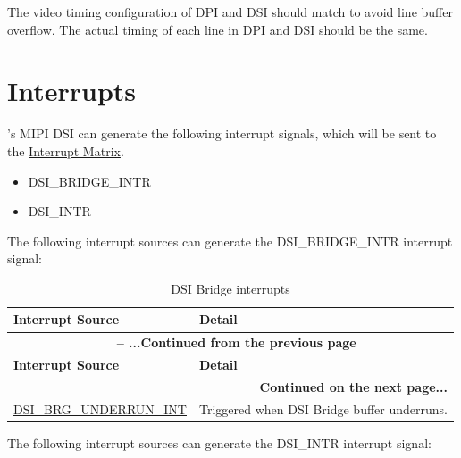 \documentclass[main\_\_EN.tex]{subfiles}
\begin{document}
The video timing configuration of DPI and DSI should match to avoid line buffer overflow. The actual timing of each line in DPI and DSI should be the same.


\section{Interrupts}
\chipname{}'s MIPI DSI can generate the following interrupt signals, which will be sent to the \hyperref[mod:intmtrx]{Interrupt Matrix}.

\begin{itemize}
    \item DSI\_BRIDGE\_INTR
    \item DSI\_INTR
\end{itemize}

The following interrupt sources can generate the DSI\_BRIDGE\_INTR interrupt signal:

\begin{longtable}[c]{ |p{5cm}|p{10cm}| }
    \caption{DSI Bridge interrupts}
    \label{tab:dsi-bridge-intr}\\\hline

    \rowcolor{lightgray}
    \textbf{Interrupt Source} & \textbf{Detail} \\\hline
    \endfirsthead


    \multicolumn{2}{c}{\bfseries \tablename\ \thetable{} -- ...Continued from the previous page}\\\hline
    \rowcolor{lightgray}
    \textbf{Interrupt Source} & \textbf{Detail} \\\hline
    \endhead

    \multicolumn{2}{r}{\textbf{Continued on the next page...}} \\
    \endfoot

    \endlastfoot

    \hyperref[fielddesc:DSIBRGUNDERRUNINTRAW]{DSI\_BRG\_UNDERRUN\_INT} & Triggered when DSI Bridge buffer underruns. \\\hline
        

\end{longtable}

The following interrupt sources can generate the DSI\_INTR interrupt signal:
\end{document}
